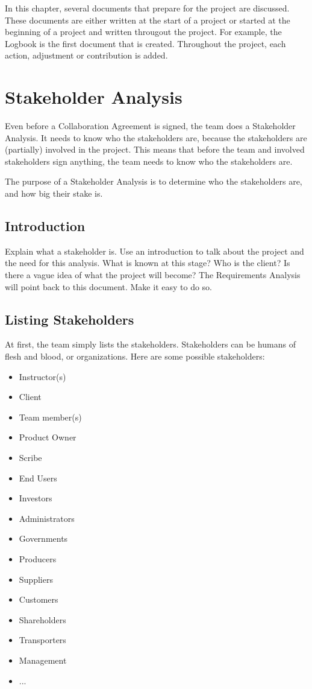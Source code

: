 \documentclass[10pt]{report}
\begin{document}
In this chapter, several documents that prepare for the project are discussed. These documents are either written at the start of a project or started at the beginning of a project and written througout the project. For example, the Logbook is the first document that is created. Throughout the project, each action, adjustment or contribution is added.

\medskip
\minitoc

\newpage

\section{Stakeholder Analysis}

Even before a Collaboration Agreement is signed, the team does a Stakeholder Analysis. It needs to know who the stakeholders are, because the stakeholders are (partially) involved in the project. This means that before the team and involved stakeholders sign anything, the team needs to know who the stakeholders are.

\bigskip

The purpose of a Stakeholder Analysis is to determine who the stakeholders are, and how big their stake is.

\subsection{Introduction}

Explain what a stakeholder is. Use an introduction to talk about the project and the need for this analysis. What is known at this stage? Who is the client? Is there a vague idea of what the project will become? The Requirements Analysis will point back to this document. Make it easy to do so.

\subsection{Listing Stakeholders}

At first, the team simply lists the stakeholders. Stakeholders can be humans of flesh and blood, or organizations. Here are some possible stakeholders:

\begin{itemize}
	\item Instructor(s)
	\item Client
	\item Team member(s)
	\item Product Owner
	\item Scribe
	\item End Users
	\item Investors
	\item Administrators
	\item Governments
	\item Producers
	\item Suppliers
	\item Customers
	\item Shareholders
	\item Transporters
	\item Management
	\item ...
\end{itemize}
\end{document}
